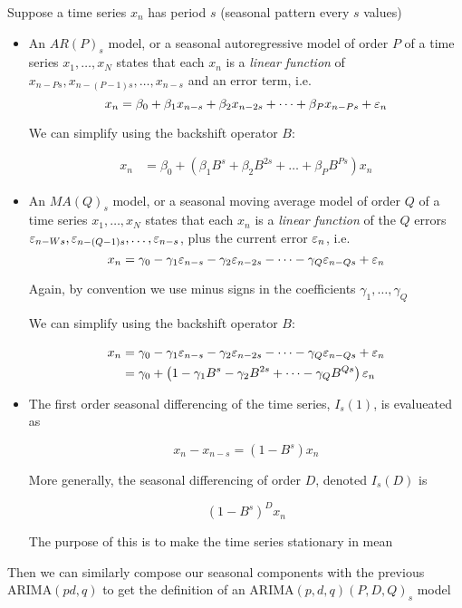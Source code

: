 Suppose a time series $x_n$ has period $s$ (seasonal pattern every $s$ values)
\begin{itemize}

\item An $AR(P)_s$ model, or a seasonal autoregressive model of order $P$ of a time series $x_1,\dots,x_N$ states that each $x_n$ is a \textit{linear function} of $x_{n-Ps},x_{n-(P-1)s},\dots,x_{n-s}$ and an error term, i.e. 
$$x_n= \beta_0+\beta_1 x_{n-s}+\beta_2 x_{n-2s} +\dots + \beta_P x_{n-Ps}+\varepsilon_n$$

We can simplify using the backshift operator $B$:

\begin{align}
x_n &= \beta_0+\left(\beta_1 B^s+\beta_2 B^{2s} +\dots + \beta_P B^{Ps}\right)x_n
\end{align}

\item An $MA(Q)_s$ model, or a seasonal moving average model of order $Q$ of a time series $x_1,\dots,x_N$ states that each $x_n$ is a \textit{linear function} of the $Q$ errors $\varepsilon_{n-Ws},\varepsilon_{n-(Q-1)s},\dots,\varepsilon_{n-s}$, plus the current error $\varepsilon_n$, i.e. 
$$x_n= \gamma_0-\gamma_1 \varepsilon_{n-s}-\gamma_2 \varepsilon_{n-2s} -\dots - \gamma_Q \varepsilon_{n-Qs}+\varepsilon_n$$

Again, by convention we use minus signs in the coefficients $\gamma_1,\dots,\gamma_Q$

We can simplify using the backshift operator $B$:

\begin{align}
x_n
&= \gamma_0-\gamma_1 \varepsilon_{n-s}-\gamma_2 \varepsilon_{n-2s} -\dots - \gamma_Q \varepsilon_{n-Qs}+\varepsilon_n \nonumber \\
&= \gamma_0+\left(1-\gamma_1 B^s-\gamma_2 B^{2s} +\dots - \gamma_Q B^{Qs}\right)\varepsilon_n 
\end{align}

\item The first order seasonal differencing of the time series, $I_s(1)$, is evalueated as 

$$x_n-x_{n-s}=\left(1-B^s\right)x_n$$

More generally, the seasonal differencing of order $D$, denoted $I_s(D)$ is 

$$(1-B^s)^D x_n$$

The purpose of this is to make the time series  stationary in mean
\end{itemize}


Then we can similarly compose our seasonal components with the previous ARIMA$(pd,q)$ to get the definition of an ARIMA$(p,d,q)(P,D,Q)_s$ model

